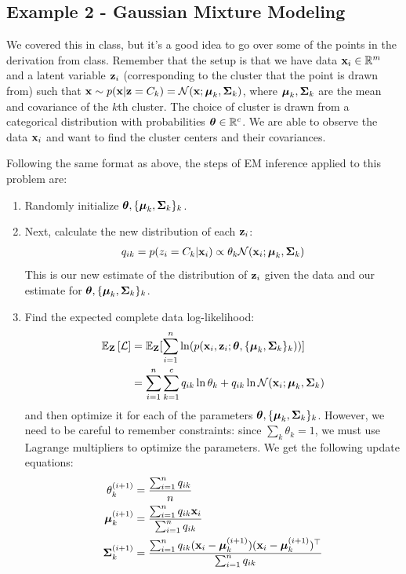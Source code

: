 \documentclass[12pt,letterpaper]{article}
\begin{document}
\subsection{Example 2 - Gaussian Mixture Modeling}

We covered this in class, but it's a good idea to go over some of the points in the derivation from class. Remember that the setup is that we have data $\mathbf{x}_i \in \mathbb{R}^{m}$ and a latent variable $\mathbf{z}_i$ (corresponding to the cluster that the point is drawn from) such that $\mathbf{x} \sim p(\mathbf{x} | \mathbf{z} = C_k) = \mathcal{N}(\mathbf{x}; \boldsymbol{\mu}_k, \mathbf{\Sigma}_k)$, where $\boldsymbol{\mu}_k, \mathbf{\Sigma}_k$ are the mean and covariance of the $k$th cluster. The choice of cluster is drawn from a categorical distribution with probabilities $\boldsymbol{\theta} \in \mathbb{R}^c$. We are able to observe the data $\mathbf{x}_i$ and want to find the cluster centers and their covariances.

Following the same format as above, the steps of EM inference applied to this problem are:
\begin{enumerate}
    \item Randomly initialize $\boldsymbol{\theta}, \{\boldsymbol{\mu}_k, \mathbf{\Sigma}_k\}_k$.
    \item Next, calculate the new distribution of each $\mathbf{z}_i$:
        \begin{align}
            q_{ik} = p(z_i = C_k | \mathbf{x}_i) \propto \theta_k \mathcal{N}(\mathbf{x}_i; \boldsymbol{\mu}_k, \mathbf{\Sigma}_k)
        \end{align}
    This is our new estimate of the distribution of $\mathbf{z}_i$ given the data and our estimate for $\boldsymbol{\theta}, \{\boldsymbol{\mu}_k, \mathbf{\Sigma}_k\}_k$.
    \item Find the expected complete data log-likelihood:
    \begin{align}
         \mathbb{E}_{\mathbf{Z}}\left[\mathcal{L}\right] &= \mathbb{E}_{\mathbf{Z}}[\sum_{i = 1}^n \ln(p(\mathbf{x}_i, \mathbf{z}_i; \boldsymbol{\theta}, \{\boldsymbol{\mu}_k, \mathbf{\Sigma}_k\}_k))] \\
         &= \sum_{i = 1}^n\sum_{k = 1}^c q_{ik} \ln \theta_k + q_{ik} \ln \mathcal{N}(\mathbf{x}_i; \boldsymbol{\mu}_k, \mathbf{\Sigma}_k) 
    \end{align}
    and then optimize it for each of the parameters $\boldsymbol{\theta}, \{\boldsymbol{\mu}_k, \mathbf{\Sigma}_k\}_k$. However, we need to be careful to remember constraints: since $\sum_k \theta_k = 1$, we must use Lagrange multipliers to optimize the parameters. We get the following update equations:
    \begin{align}
        \theta_k^{(i + 1)} &= \frac{\sum_{i = 1}^n q_{ik}}{n} \\
        \boldsymbol{\mu}_k^{(i + 1)} &= \frac{\sum_{i = 1}^n q_{ik}\mathbf{x}_i}{\sum_{i = 1}^n q_{ik}} \\
        \mathbf{\Sigma}_k^{(i + 1)} &= \frac{\sum_{i = 1}^n q_{ik}(\mathbf{x}_i - \boldsymbol{\mu}_k^{(i + 1)})(\mathbf{x}_i - \boldsymbol{\mu}_k^{(i + 1)})^{\top}}{\sum_{i = 1}^n q_{ik}}
    \end{align}
\end{enumerate}
\end{document}
